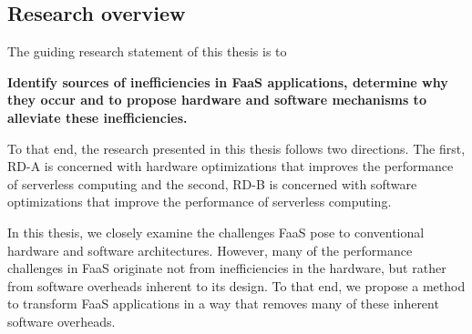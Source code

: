 \documentclass[../main.tex]{subfiles}
\begin{document}
\begin{refsection}



\section{Research overview}
The guiding research statement of this thesis is to 
\begin{framed}
\noindent
\textbf{Identify sources of inefficiencies in FaaS applications, determine why they occur and to propose hardware and software mechanisms to alleviate these inefficiencies.}
\end{framed}
\noindent
To that end, the research presented in this thesis follows two
directions. The first, RD-A is concerned with hardware optimizations
that improves the performance of serverless computing and the second,
RD-B is concerned with software optimizations that improve the
performance of serverless computing.

In this thesis, we closely examine the challenges FaaS pose to
conventional hardware and software architectures.  However, many of the
performance challenges in FaaS originate not from inefficiencies in
the hardware, but rather from software overheads inherent to its
design. To that end, we propose a method to transform FaaS
applications in a way that removes many of these inherent software overheads.





\end{refsection}
\end{document}
